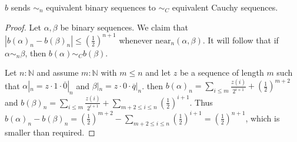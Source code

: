 


\begin{lemma}
  $b$ sends $\sim_n$ equivalent binary sequences to $\sim_C$ equivalent Cauchy sequences. 
\end{lemma}
\begin{proof}
  Let $\alpha, \beta$ be binary sequences.
  We claim that $|b(\alpha)_n - b(\beta)_n| \leq (\frac12)^{n+1}$ 
  whenever $\text{near}_n(\alpha, \beta)$. 
  It will follow that if $\alpha\sim_n \beta$, then 
  $b(\alpha)\sim_C b(\beta)$. 

  Let $n:\mathbb N$ and assume $m:\mathbb N$ with $m\leq n$ and 
  let $z$ be a sequence of length $m$ such that 
  $\alpha|_n = z\cdot 1 \cdot \overline 0|_n$ and $\beta|_n = z \cdot 0 \cdot \overline q |_n$. 
  then $b(\alpha)_n = \sum_{i\leq m} \frac{z(i)}{2^{i+1}} + (\frac12)^{m+2}$ and 
  $b(\beta)_n = \sum_{i\leq m} \frac{z(i)}{2^{i+1}} + \sum\limits_{m+2 \leq i \leq n}(\frac12)^{i+1}$. 
  Thus 
  $b(\alpha)_n - b(\beta)_n = (\frac12)^{m+2} - \sum\limits_{m+2 \leq i \leq n}(\frac12)^{i+1} = 
  (\frac12)^{n+1}$, 
  which is smaller than required. 
\end{proof}  

